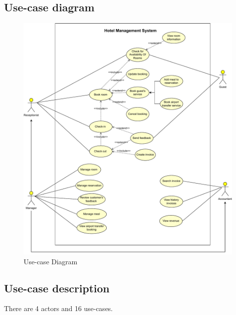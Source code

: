     \subsection{Use-case diagram}
    \begin{figure}[H]
        \includegraphics[width=\textwidth]{img/usecase-diagram.pdf}
        \caption{Use-case Diagram }
        \label{fig: Use-case Diagram }
    \end{figure}
    \subsection{Use-case description}
    There are 4 actors and 16 use-cases.
    
